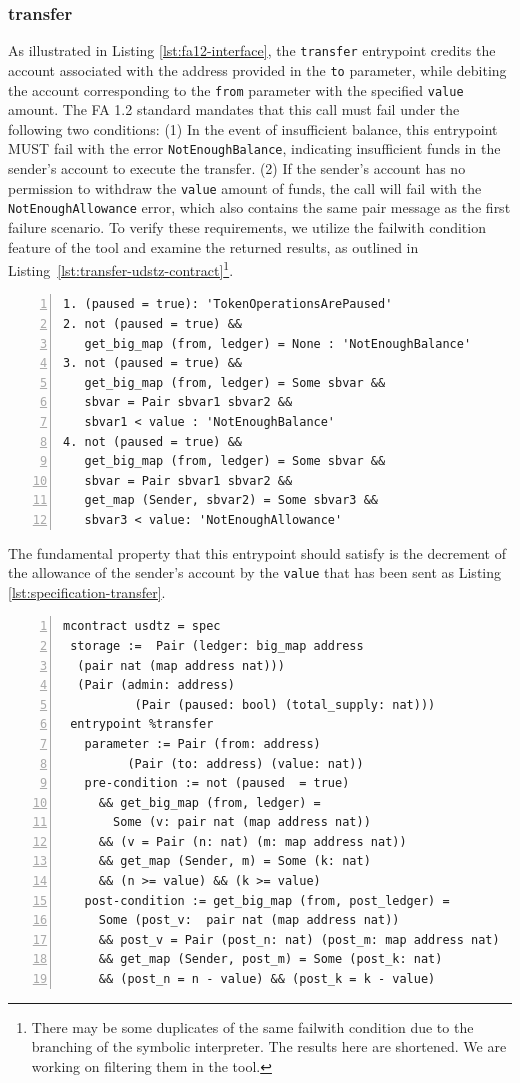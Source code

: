 \documentclass[a4paper,USenglish,cleveref, autoref,anonymous]{lipics-v2021}
\begin{document}
\subsubsection{transfer}
As illustrated in Listing \ref{lst:fa12-interface}, the
\lstinline/transfer/ entrypoint credits the account associated with
the address provided in the \lstinline/to/ parameter, while debiting
the account corresponding to the \lstinline/from/ parameter with the
specified \lstinline/value/ amount. The FA 1.2 standard mandates that
this call must fail under the following two conditions: (1) In the
event of insufficient balance, this entrypoint MUST fail with the
error \lstinline/NotEnoughBalance/, indicating insufficient funds in
the sender's account to execute the transfer. (2) If the sender's
account has no permission to withdraw the \lstinline/value/ amount of
funds, the call will fail with the \lstinline/NotEnoughAllowance/
error, which also contains the same pair message as the first failure
scenario. To verify these requirements, we utilize the failwith
condition feature of the tool and examine the returned results, as
outlined in Listing~\ref{lst:transfer-udstz-contract}\footnote{There may be some duplicates of the same failwith condition due to the branching of the symbolic interpreter. The results here are shortened. We are working on filtering them in the tool.}.
\begin{lstlisting}[float,captionpos=b,caption={Fail conditions for the \lstinline/transfer/ entrypoint},label={lst:transfer-udstz-contract},numbers=left]
1. (paused = true): 'TokenOperationsArePaused'
2. not (paused = true) &&
   get_big_map (from, ledger) = None : 'NotEnoughBalance'
3. not (paused = true) &&
   get_big_map (from, ledger) = Some sbvar &&
   sbvar = Pair sbvar1 sbvar2 &&
   sbvar1 < value : 'NotEnoughBalance'
4. not (paused = true) &&
   get_big_map (from, ledger) = Some sbvar &&
   sbvar = Pair sbvar1 sbvar2 &&
   get_map (Sender, sbvar2) = Some sbvar3 &&
   sbvar3 < value: 'NotEnoughAllowance'
\end{lstlisting}
The fundamental property that this entrypoint should satisfy is the decrement of the allowance of the sender's account by the \lstinline/value/ that has been sent as Listing \ref{lst:specification-transfer}.
\begin{lstlisting}[float,captionpos=b,caption={Specification of the \lstinline/transfer/ entrypoint},label={lst:specification-transfer},numbers=left]
mcontract usdtz = spec 
 storage :=  Pair (ledger: big_map address 
  (pair nat (map address nat))) 
  (Pair (admin: address) 
          (Pair (paused: bool) (total_supply: nat)))
 entrypoint %transfer
   parameter := Pair (from: address)
         (Pair (to: address) (value: nat))
   pre-condition := not (paused  = true)
     && get_big_map (from, ledger) = 
       Some (v: pair nat (map address nat))
     && (v = Pair (n: nat) (m: map address nat))
     && get_map (Sender, m) = Some (k: nat) 
     && (n >= value) && (k >= value)
   post-condition := get_big_map (from, post_ledger) = 
     Some (post_v:  pair nat (map address nat))
     && post_v = Pair (post_n: nat) (post_m: map address nat) 
     && get_map (Sender, post_m) = Some (post_k: nat) 
     && (post_n = n - value) && (post_k = k - value)
\end{lstlisting}
\end{document}
